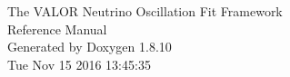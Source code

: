 \documentclass[twoside]{book}
\newcommand{\+}{\discretionary{\mbox{\scriptsize$\hookleftarrow$}}{}{}}
\newcommand{\clearemptydoublepage}{%
  \newpage{\pagestyle{empty}\cleardoublepage}%
}
\begin{document}
\hypersetup{pageanchor=false,
             bookmarks=true,
             bookmarksnumbered=true,
             pdfencoding=unicode
            }
\begin{titlepage}
\vspace*{7cm}
\begin{center}%
{\Large The VALOR Neutrino Oscillation Fit Framework \\ Reference Manual}\\
\vspace*{1cm}
{\large Generated by Doxygen 1.8.10}\\
\vspace*{0.5cm}
{\small Tue Nov 15 2016 13:45:35}\\
\end{center}
\end{titlepage}
\clearemptydoublepage
\tableofcontents
\clearemptydoublepage
{}
\hypersetup{pageanchor=true}

\end{document}
